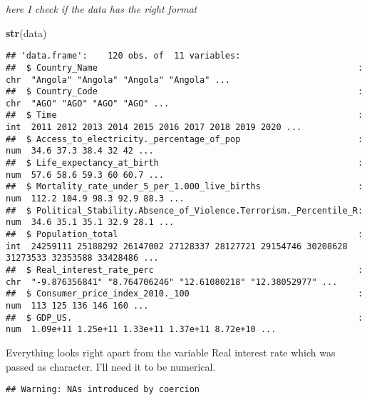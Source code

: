 \documentclass[
]{article}
\newenvironment{Shaded}{\begin{snugshade}}{\end{snugshade}}
\newcommand{\FunctionTok}[1]{\textcolor[rgb]{0.13,0.29,0.53}{\textbf{#1}}}
\newcommand{\NormalTok}[1]{#1}
\newcommand{\OtherTok}[1]{\textcolor[rgb]{0.56,0.35,0.01}{#1}}
\newcommand{\SpecialCharTok}[1]{\textcolor[rgb]{0.81,0.36,0.00}{\textbf{#1}}}
\begin{document}
\emph{here I check if the data has the right format}

\begin{Shaded}
\begin{Highlighting}[]
\FunctionTok{str}\NormalTok{(data)}
\end{Highlighting}
\end{Shaded}

\begin{verbatim}
## 'data.frame':    120 obs. of  11 variables:
##  $ Country_Name                                                   : chr  "Angola" "Angola" "Angola" "Angola" ...
##  $ Country_Code                                                   : chr  "AGO" "AGO" "AGO" "AGO" ...
##  $ Time                                                           : int  2011 2012 2013 2014 2015 2016 2017 2018 2019 2020 ...
##  $ Access_to_electricity._percentage_of_pop                       : num  34.6 37.3 38.4 32 42 ...
##  $ Life_expectancy_at_birth                                       : num  57.6 58.6 59.3 60 60.7 ...
##  $ Mortality_rate_under_5_per_1.000_live_births                   : num  112.2 104.9 98.3 92.9 88.3 ...
##  $ Political_Stability.Absence_of_Violence.Terrorism._Percentile_R: num  34.6 35.1 35.1 32.9 28.1 ...
##  $ Population_total                                               : int  24259111 25188292 26147002 27128337 28127721 29154746 30208628 31273533 32353588 33428486 ...
##  $ Real_interest_rate_perc                                        : chr  "-9.876356841" "8.764706246" "12.61080218" "12.38052977" ...
##  $ Consumer_price_index_2010._100                                 : num  113 125 136 146 160 ...
##  $ GDP_US.                                                        : num  1.09e+11 1.25e+11 1.33e+11 1.37e+11 8.72e+10 ...
\end{verbatim}

Everything looks right apart from the variable Real interest rate which
was passed as character. I'll need it to be numerical.

\begin{Shaded}
\end{Shaded}

\begin{verbatim}
## Warning: NAs introduced by coercion
\end{verbatim}
\end{document}
